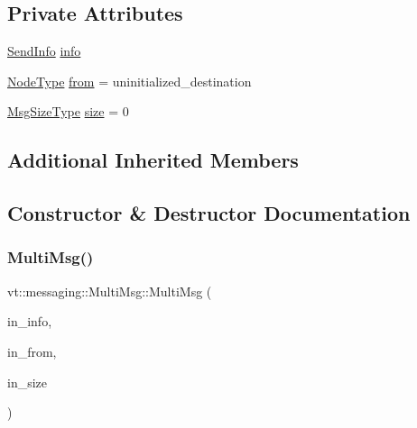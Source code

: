 \subsection*{Private Attributes}
\begin{DoxyCompactItemize}
\item 
\hyperlink{structvt_1_1messaging_1_1_send_info}{Send\+Info} \hyperlink{structvt_1_1messaging_1_1_multi_msg_ad47d1f9a6bb2661d88e11e80b462aaf0}{info}
\item 
\hyperlink{namespacevt_a866da9d0efc19c0a1ce79e9e492f47e2}{Node\+Type} \hyperlink{structvt_1_1messaging_1_1_multi_msg_a5686b316a79761a7e75b5206506be048}{from} = uninitialized\+\_\+destination
\item 
\hyperlink{namespacevt_a408e86a8c7c89309b52907dc5a513924}{Msg\+Size\+Type} \hyperlink{structvt_1_1messaging_1_1_multi_msg_a05e791d373d9a5c0eb54c55a32af7cb9}{size} = 0
\end{DoxyCompactItemize}
\subsection*{Additional Inherited Members}


\subsection{Constructor \& Destructor Documentation}
\mbox{\label{structvt_1_1messaging_1_1_multi_msg_acd927cddf86133a0cf418ac8e44ccea0}} 
\subsubsection{\texorpdfstring{Multi\+Msg()}{MultiMsg()}}
{\footnotesize\ttfamily vt\+::messaging\+::\+Multi\+Msg\+::\+Multi\+Msg (\begin{DoxyParamCaption}\item[{\hyperlink{structvt_1_1messaging_1_1_send_info}{Send\+Info}}]{in\+\_\+info,  }\item[{\hyperlink{namespacevt_a866da9d0efc19c0a1ce79e9e492f47e2}{Node\+Type}}]{in\+\_\+from,  }\item[{\hyperlink{namespacevt_a408e86a8c7c89309b52907dc5a513924}{Msg\+Size\+Type}}]{in\+\_\+size }\end{DoxyParamCaption})\hspace{0.3cm}{\ttfamily [inline]}}



